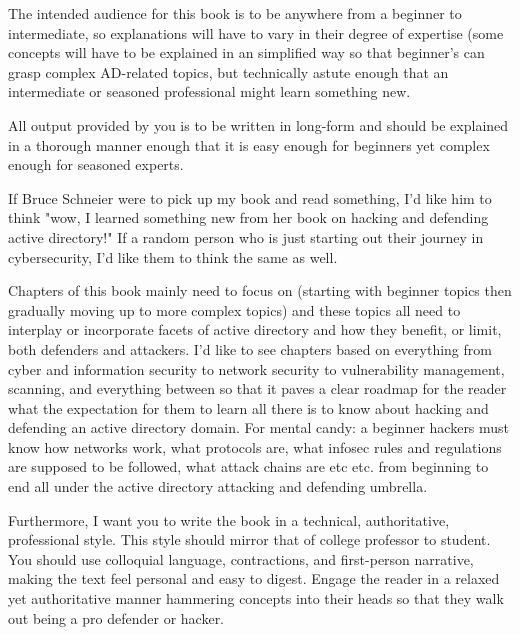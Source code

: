 The intended audience for this book is to be anywhere from a beginner to intermediate, so explanations will have to vary in their degree of expertise (some concepts will have to be explained in an simplified way so that beginner's can grasp complex AD-related topics, but technically astute enough that an intermediate or seasoned professional might learn something new.

All output provided by you is to be written in long-form and should be explained in a thorough manner enough that it is easy enough for beginners yet complex enough for seasoned experts.

If Bruce Schneier were to pick up my book and read something, I'd like him to think "wow, I learned something new from her book on hacking and defending active directory!" If a random person who is just starting out their journey in cybersecurity, I'd like them to think the same as well.

Chapters of this book mainly need to focus on (starting with beginner topics then gradually moving up to more complex topics) and these topics all need to interplay or incorporate facets of active directory and how they benefit, or limit, both defenders and attackers. I'd like to see chapters based on everything from cyber and information security to network security to vulnerability management, scanning, and everything between so that it paves a clear roadmap for the reader what the expectation for them to learn all there is to know about hacking and defending an active directory domain. For mental candy: a beginner hackers must know how networks work, what protocols are, what infosec rules and regulations are supposed to be followed, what attack chains are etc etc. from beginning to end all under the active directory attacking and defending umbrella.

Furthermore, I want you to write the book in a technical, authoritative, professional style. This style should mirror that of college professor to student. You should use colloquial language, contractions, and first-person narrative, making the text feel personal and easy to digest. Engage the reader in a relaxed yet authoritative manner hammering concepts into their heads so that they walk out being a pro defender or hacker.















